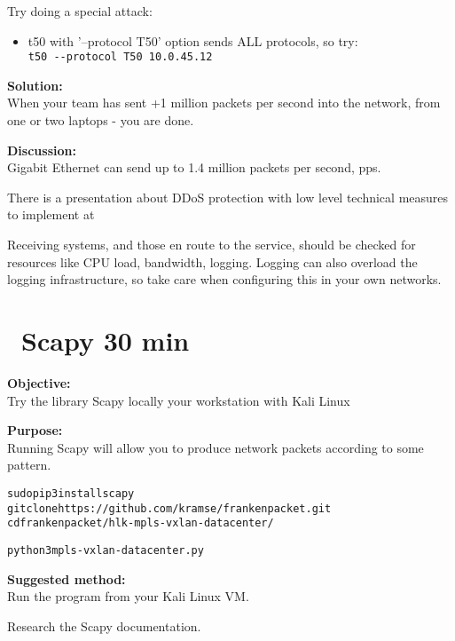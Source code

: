 \documentclass[a4paper,11pt,notitlepage]{report}
\begin{document}
Try doing a special attack:
\begin{itemize}
\item t50 with '--protocol T50' option sends ALL protocols, so try:\\
\verb+t50 --protocol T50 10.0.45.12+
\end{itemize}


{\bf Solution:}\\
When your team has sent +1 million packets per second into the network, from one or two laptops - you are done.

{\bf Discussion:}\\
Gigabit Ethernet can send up to 1.4 million packets per second, pps.

There is a presentation about DDoS protection with low level technical measures to implement at\\
{\footnotesize {}}

Receiving systems, and those en route to the service, should be checked for resources like CPU load, bandwidth, logging. Logging can also overload the logging infrastructure, so take care when configuring this in your own networks.




\chapter{\faInfoCircle\ Scapy 30 min}
\label{ex:scapy}

{\bf Objective:}\\
Try the library Scapy locally your workstation with Kali Linux


{\bf Purpose:}\\
Running Scapy will allow you to produce network packets according to some pattern.

\begin{alltt}\footnotesize
sudo pip3 install scapy
git clone https://github.com/kramse/frankenpacket.git
cd frankenpacket/hlk-mpls-vxlan-datacenter/

python3 mpls-vxlan-datacenter.py
\end{alltt}


{\bf Suggested method:}\\
Run the program from your Kali Linux VM.

Research the Scapy documentation.\\
\end{document}

